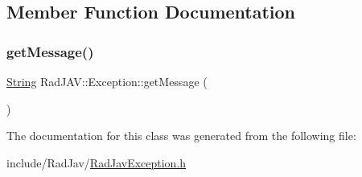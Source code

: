 \subsection{Member Function Documentation}
\mbox{\label{class_rad_j_a_v_1_1_exception_ad996ff7a0fcb2b357beff4742cc759ea}} 
\subsubsection{\texorpdfstring{get\+Message()}{getMessage()}}
{\footnotesize\ttfamily \mbox{\hyperlink{class_rad_j_a_v_1_1_string}{String}} Rad\+J\+A\+V\+::\+Exception\+::get\+Message (\begin{DoxyParamCaption}{ }\end{DoxyParamCaption})\hspace{0.3cm}{\ttfamily [inline]}}



The documentation for this class was generated from the following file\+:\begin{DoxyCompactItemize}
\item 
include/\+Rad\+Jav/\mbox{\hyperlink{_rad_jav_exception_8h}{Rad\+Jav\+Exception.\+h}}\end{DoxyCompactItemize}
